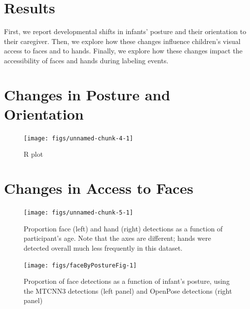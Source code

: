 \documentclass[10pt, letterpaper]{article}
\newenvironment{CodeChunk}{}{}
\begin{document}
\section{Results}\label{results}

First, we report developmental shifts in infants' posture and their
orientation to their caregiver. Then, we explore how these changes
influence children's visual access to faces and to hands. Finally, we
explore how these changes impact the accessibility of faces and hands
during labeling events.

\section{Changes in Posture and
Orientation}\label{changes-in-posture-and-orientation}

\begin{CodeChunk}
\begin{figure}[H]

{\centering \texttt{[image: figs/unnamed-chunk-4-1]} 

}

\caption[R plot]{R plot}\label{fig:unnamed-chunk-4}
\end{figure}
\end{CodeChunk}

\section{Changes in Access to Faces}\label{changes-in-access-to-faces}

\begin{CodeChunk}
\begin{figure}[h]

{\centering \texttt{[image: figs/unnamed-chunk-5-1]} 

}

\caption[Proportion face (left) and hand (right) detections as a function of participant's age]{Proportion face (left) and hand (right) detections as a function of participant's age. Note that the axes are different; hands were detected overall much less frequently in this dataset.}\label{fig:unnamed-chunk-5}
\end{figure}
\end{CodeChunk}

\begin{CodeChunk}
\begin{figure}[h]

{\centering \texttt{[image: figs/faceByPostureFig-1]} 

}

\caption[Proportion of face detections as a function of infant's posture, using the MTCNN3 detections (left panel) and OpenPose detections (right panel)]{Proportion of face detections as a function of infant's posture, using the MTCNN3 detections (left panel) and OpenPose detections (right panel)}\label{fig:faceByPostureFig}
\end{figure}
\end{CodeChunk}
\end{document}
